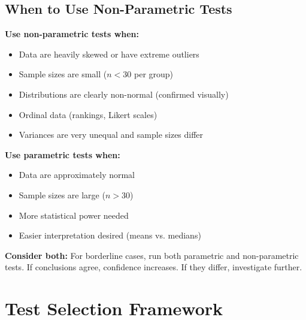 \subsection{When to Use Non-Parametric Tests}

\textbf{Use non-parametric tests when:}
\begin{itemize}
    \item Data are heavily skewed or have extreme outliers
    \item Sample sizes are small ($n < 30$ per group)
    \item Distributions are clearly non-normal (confirmed visually)
    \item Ordinal data (rankings, Likert scales)
    \item Variances are very unequal and sample sizes differ
\end{itemize}

\textbf{Use parametric tests when:}
\begin{itemize}
    \item Data are approximately normal
    \item Sample sizes are large ($n > 30$)
    \item More statistical power needed
    \item Easier interpretation desired (means vs. medians)
\end{itemize}

\textbf{Consider both:} For borderline cases, run both parametric and non-parametric tests. If conclusions agree, confidence increases. If they differ, investigate further.

\section{Test Selection Framework}

